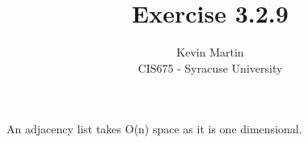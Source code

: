 \documentclass{article}
\author{Kevin Martin\\ CIS675 - Syracuse University}
\title{Exercise 3.2.9}
\begin{document}
\maketitle
An adjacency list takes O(n) space as it is one dimensional.
\end{document}
